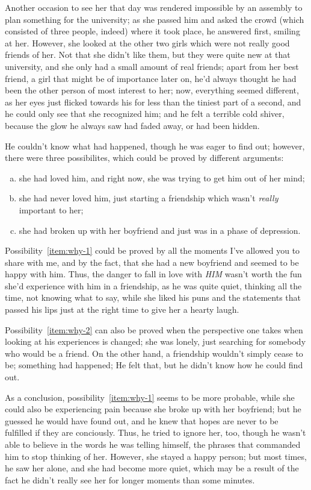 Another occasion to see her that day was rendered impossible by an assembly to plan something for the university; as she passed him and asked the crowd (which consisted of three people, indeed) where it took place, he answered first, smiling at her. However, she looked at the other two girls which were not really good friends of her. Not that she didn't like them, but they were quite new at that university, and she only had a small amount of real friends; apart from her best friend, a girl that might be of importance later on, he'd always thought he had been the other person of most interest to her; now, everything seemed different, as her eyes just flicked towards his for less than the tiniest part of a second, and he could only see that she recognized him; and he felt a terrible cold shiver, because the glow he always saw had faded away, or had been hidden.

He couldn't know what had happened, though he was eager to find out; however, there were three possibilites, which could be proved by different arguments:
\begin{enumerate}[(a)]
\item she had loved him, and right now, she was trying to get him out of her mind;\label{item:why-1}
\item she had never loved him, just starting a friendship which wasn't \emph{really} important to her;\label{item:why-2}
\item she had broken up with her boyfriend and just was in a phase of depression.\label{item:why-3}
\end{enumerate}
Possibility~\ref{item:why-1} could be proved by all the moments I've allowed you to share with me, and by the fact, that she had a new boyfriend and seemed to be happy with him. Thus, the danger to fall in love with \emph{HIM} wasn't worth the fun she'd experience with him in a friendship, as he was quite quiet, thinking all the time, not knowing what to say, while she liked his puns and the statements that passed his lips just at the right time to give her a hearty laugh.

Possibility~\ref{item:why-2} can also be proved when the perspective one takes when looking at his experiences is changed; she was lonely, just searching for somebody who would be a friend. On the other hand, a friendship wouldn't simply cease to be; something had happened; He felt that, but he didn't know how he could find out.

As a conclusion, possibility~\ref{item:why-1} seems to be more probable, while she could also be experiencing pain because she broke up with her boyfriend; but he guessed he would have found out, and he knew that hopes are never to be fulfilled if they are conciously. Thus, he tried to ignore her, too, though he wasn't able to believe in the words he was telling himself, the phrases that commanded him to stop thinking of her. However, she stayed a happy person; but most times, he saw her alone, and she had become more quiet, which may be a result of the fact he didn't really see her for longer moments than some minutes.

